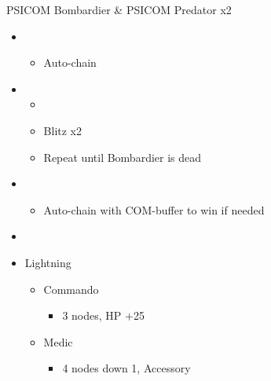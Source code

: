 \begin{paracol}{2}
\begin{battle}{PSICOM Bombardier \& PSICOM Predator x2}
\begin{itemize}
			\item \second
			      \begin{itemize}
				      \item Auto-chain
			      \end{itemize}
			\item \first
			      \begin{itemize}
				      \item \stagger
				      \item Blitz x2
				      \item Repeat until Bombardier is dead
			      \end{itemize}
			\item \second
			      \begin{itemize}
				      \item Auto-chain with COM-buffer to win if needed
			      \end{itemize}
		\end{itemize}
		 
	\end{battle}
	\switchcolumn*
	\begin{menu}
		\begin{itemize}
			\paradigm
			\begin{itemize}
				\item {}%
				      {\paradigmline[1]{\textit{\com}}{\textit{\com}}{\textit{\rav}}}
				      {\paradigmline{\rav}{\com}{\rav}}%
				      {\paradigmline{\rav}{\sab}{\rav}}%
				      {\paradigmline{\rav}{\sen}{\rav}}%
				      {\paradigmline{(\com)}{(\com)}{\syn}}%
				      {\paradigmline{(\com)}{\com}{(\med)}}
			\end{itemize}
			\crystarium
			\begin{itemize}
				\item Lightning
				      \begin{itemize}
					      \item Commando
					            \begin{itemize}
						            \item 3 nodes, HP +25
					            \end{itemize}
					      \item Medic
					            \begin{itemize}
						            \item 4 nodes down 1, Accessory
					            \end{itemize}

\end{itemize}
\end{itemize}
\end{itemize}
\end{menu}
\end{paracol}
